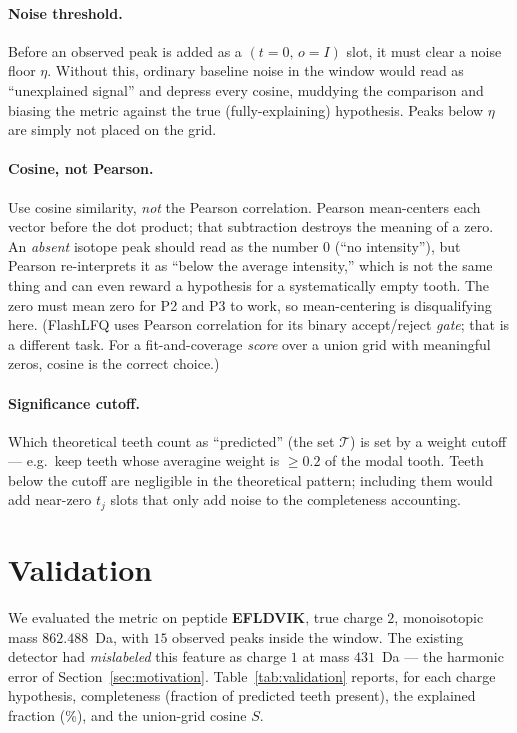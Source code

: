 \documentclass[11pt]{article}
\begin{document}
\paragraph{Noise threshold.}
Before an observed peak is added as a $(t=0,\,o=I)$ slot, it must clear a noise
floor $\eta$. Without this, ordinary baseline noise in the window would read as
``unexplained signal'' and depress every cosine, muddying the comparison and
biasing the metric against the true (fully-explaining) hypothesis. Peaks below
$\eta$ are simply not placed on the grid.

\paragraph{Cosine, not Pearson.}
Use cosine similarity, \emph{not} the Pearson correlation. Pearson mean-centers each
vector before the dot product; that subtraction destroys the meaning of a zero. An
\emph{absent} isotope peak should read as the number $0$ (``no intensity''), but
Pearson re-interprets it as ``below the average intensity,'' which is not the same
thing and can even reward a hypothesis for a systematically empty tooth. The zero
must mean zero for P2 and P3 to work, so mean-centering is disqualifying here.
(FlashLFQ uses Pearson correlation for its binary accept/reject \emph{gate}; that is
a different task. For a fit-and-coverage \emph{score} over a union grid with
meaningful zeros, cosine is the correct choice.)

\paragraph{Significance cutoff.}
Which theoretical teeth count as ``predicted'' (the set $\mathcal{T}$) is set by a
weight cutoff --- e.g.\ keep teeth whose averagine weight is $\ge 0.2$ of the modal
tooth. Teeth below the cutoff are negligible in the theoretical pattern; including
them would add near-zero $t_j$ slots that only add noise to the completeness
accounting.

\section{Validation}
\label{sec:validation}

We evaluated the metric on peptide \textbf{EFLDVIK}, true charge $2$, monoisotopic
mass $862.488$~Da, with $15$ observed peaks inside the window. The existing detector
had \emph{mislabeled} this feature as charge $1$ at mass $431$~Da --- the harmonic
error of Section~\ref{sec:motivation}. Table~\ref{tab:validation} reports, for each
charge hypothesis, completeness (fraction of predicted teeth present), the explained
fraction (\%), and the union-grid cosine $S$.
\end{document}
